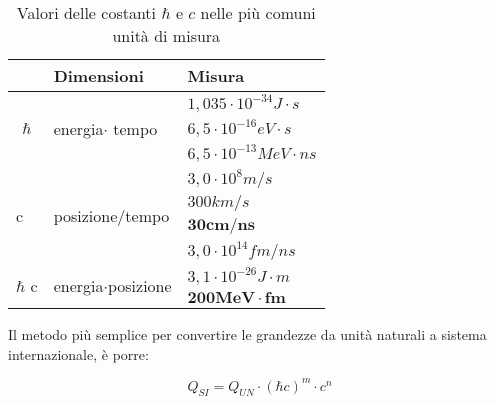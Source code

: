 \begin{table}
\center
\begin{tabular}{|l|l|l|}
\hline
                                                            & Dimensioni                                             & Misura                           \\ \hline
\multicolumn{1}{|c|}{\multirow{3}{*}{$\hbar$}} & \multirow{3}{*}{energia$\cdot$ tempo}     & $1,035 \cdot 10^{-34} J\cdot s$  \\ \cline{3-3} 
\multicolumn{1}{|c|}{}                                      &                                                        & $6,5 \cdot 10^{-16} eV\cdot s$   \\ \cline{3-3} 
\multicolumn{1}{|c|}{}                                      &                                                        & $6,5 \cdot 10^{-13} MeV\cdot ns$ \\ \hline
\multirow{4}{*}{c}                                          & \multirow{4}{*}{posizione/tempo}                       & $3,0\cdot10^8 m/s$               \\ \cline{3-3} 
                                                            &                                                        & $300 km/s$                       \\ \cline{3-3} 
                                                            &                                                        & $\mathbf{30 cm/ns}$              \\ \cline{3-3} 
                                                            &                                                        & $3,0\cdot10^{14} fm/ns$          \\ \hline
\multirow{2}{*}{$\hbar$ c}                     & \multirow{2}{*}{energia$\cdot $posizione} & $3,1\cdot 10^{-26} J\cdot m$     \\ \cline{3-3} 
                                                            &                                                        & $\mathbf{200 MeV \cdot fm}$            \\ \hline
\end{tabular}
\caption{Valori delle costanti $\hbar$ e $c$ nelle più comuni unità di misura}
\end{table}

Il metodo più semplice per convertire le grandezze da unità naturali a sistema internazionale, è porre:

\begin{equation}
Q_{SI}=Q_{UN}\cdot(\hbar c)^m\cdot c^n
\end{equation}

